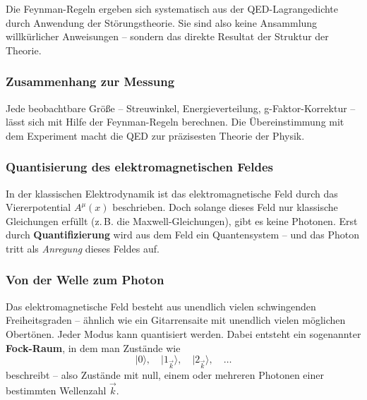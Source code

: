 \vspace{1em}
\begin{tcolorbox}[didaktikbox, title=Warum die Regeln funktionieren]
	\label{box:Warum die Regeln funktionieren}
	Die Feynman-Regeln ergeben sich systematisch aus der QED-Lagrangedichte durch Anwendung der Störungstheorie. Sie sind also keine Ansammlung willkürlicher Anweisungen – sondern das direkte Resultat der Struktur der Theorie.
\end{tcolorbox}

\subsubsection*{Zusammenhang zur Messung}
Jede beobachtbare Größe – Streuwinkel, Energieverteilung, g-Faktor-Korrektur – lässt sich mit Hilfe der Feynman-Regeln berechnen. Die Übereinstimmung mit dem Experiment macht die QED zur präzisesten Theorie der Physik.

\subsubsection{Quantisierung des elektromagnetischen Feldes}

In der klassischen Elektrodynamik ist das elektromagnetische Feld durch das Viererpotential $A^\mu(x)$ beschrieben. Doch solange dieses Feld nur klassische Gleichungen erfüllt (z.\,B. die Maxwell-Gleichungen), gibt es keine Photonen. Erst durch \textbf{Quantifizierung} wird aus dem Feld ein Quantensystem – und das Photon tritt als \emph{Anregung} dieses Feldes auf.

\subsubsection*{Von der Welle zum Photon}
Das elektromagnetische Feld besteht aus unendlich vielen schwingenden Freiheitsgraden – ähnlich wie ein Gitarrensaite mit unendlich vielen möglichen Obertönen. Jeder Modus kann quantisiert werden. Dabei entsteht ein sogenannter \textbf{Fock-Raum}, in dem man Zustände wie
\[
\lvert 0 \rangle, \quad \lvert 1_{\vec{k}} \rangle, \quad \lvert 2_{\vec{k}} \rangle, \quad \dots
\]
beschreibt – also Zustände mit null, einem oder mehreren Photonen einer bestimmten Wellenzahl $\vec{k}$.

